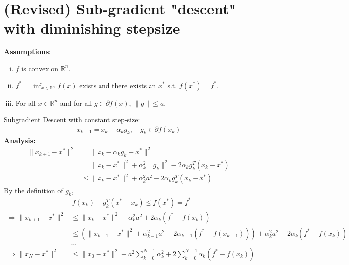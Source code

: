 \documentclass[11pt]{elegantbook}
\begin{document}
\section{(Revised) Sub-gradient "descent" with diminishing stepsize}
\textbf{\underline{Assumptions:}}
\begin{enumerate}[(i)]
    \item $f$ is convex on $\mathbb{R}^n$.
    \item $f^*=\inf_{x\in \mathbb{R}^n}f(x)$ exists and there exists an $x^*$ s.t. $f(x^*)=f^*$.
    \item For all $x\in \mathbb{R}^n$ and for all $g\in \partial f(x)$, $\|g\|\leq a$.
\end{enumerate}
Subgradient Descent with constant step-size:
\begin{equation}
    \begin{aligned}
        x_{k+1}=x_k-\alpha_k g_k,\quad g_k\in \partial f(x_k)
    \end{aligned}
    \nonumber
\end{equation}
\textbf{\underline{Analysis:}}
\begin{equation}
    \begin{aligned}
        \|x_{k+1}-x^*\|^2&=\|x_k-\alpha_k g_k-x^*\|^2\\
        &=\|x_k-x^*\|^2+\alpha_k^2\|g_k\|^2-2\alpha_k g_k^T(x_k-x^*)\\
        &\leq \|x_k-x^*\|^2+\alpha_k^2a^2-2\alpha_k g_k^T(x_k-x^*)
    \end{aligned}
    \nonumber
\end{equation}
By the definition of $g_k$,
\begin{equation}
    \begin{aligned}
        &f(x_k)+g_k^T(x^*-x_k)\leq f(x^*)=f^*
    \end{aligned}
    \nonumber
\end{equation}
\begin{equation}
    \begin{aligned}
        \Rightarrow  \|x_{k+1}-x^*\|^2&\leq \|x_k-x^*\|^2+\alpha_k^2a^2+2\alpha_k (f^*-f(x_k))\\
        &\leq \left(\|x_{k-1}-x^*\|^2+\alpha_{k-1}^2a^2+2\alpha_{k-1}(f^*-f(x_{k-1}))\right)+\alpha_k^2a^2+2\alpha_k (f^*-f(x_k))\\
        &\dots\\
        \Rightarrow  \|x_{N}-x^*\|^2&\leq \|x_{0}-x^*\|^2+a^2\sum_{k=0}^{N-1}\alpha_{k}^2+2\sum_{k=0}^{N-1}\alpha_k(f^*-f(x_{k}))
    \end{aligned}
    \nonumber
\end{equation}
\end{document}
